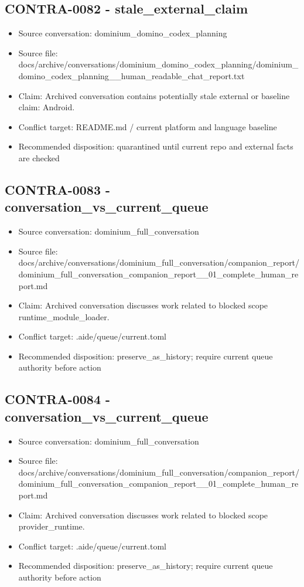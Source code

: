 \documentclass[11pt,a4paper]{report}
\begin{document}
\subsection{CONTRA-0082 - stale\_external\_claim}

\begin{itemize}
\item Source conversation: dominium\_domino\_codex\_planning
\item Source file: docs/archive/conversations/dominium\_domino\_codex\_planning/dominium\_domino\_codex\_planning\_\_human\_readable\_chat\_report.txt
\item Claim: Archived conversation contains potentially stale external or baseline claim: Android.
\item Conflict target: README.md / current platform and language baseline
\item Recommended disposition: quarantined until current repo and external facts are checked
\end{itemize}

\subsection{CONTRA-0083 - conversation\_vs\_current\_queue}

\begin{itemize}
\item Source conversation: dominium\_full\_conversation
\item Source file: docs/archive/conversations/dominium\_full\_conversation/companion\_report/dominium\_full\_conversation\_companion\_report\_\_01\_complete\_human\_report.md
\item Claim: Archived conversation discusses work related to blocked scope runtime\_module\_loader.
\item Conflict target: .aide/queue/current.toml
\item Recommended disposition: preserve\_as\_history; require current queue authority before action
\end{itemize}

\subsection{CONTRA-0084 - conversation\_vs\_current\_queue}

\begin{itemize}
\item Source conversation: dominium\_full\_conversation
\item Source file: docs/archive/conversations/dominium\_full\_conversation/companion\_report/dominium\_full\_conversation\_companion\_report\_\_01\_complete\_human\_report.md
\item Claim: Archived conversation discusses work related to blocked scope provider\_runtime.
\item Conflict target: .aide/queue/current.toml
\item Recommended disposition: preserve\_as\_history; require current queue authority before action
\end{itemize}
\end{document}

